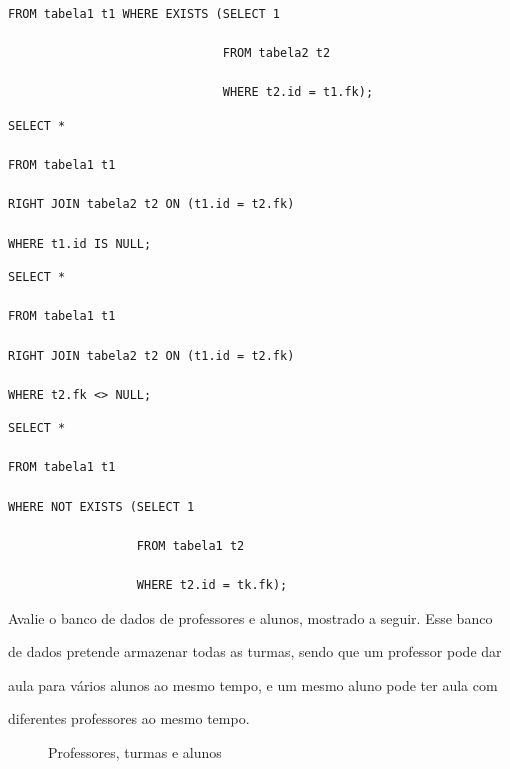 \documentclass[12pt, addpoints]{exam}
\begin{document}
\begin{questions}
\begin{choices}
\begin{verbatim}
FROM tabela1 t1 WHERE EXISTS (SELECT 1

                              FROM tabela2 t2

                              WHERE t2.id = t1.fk);

\end{verbatim}


\choice \begin{verbatim}SELECT *

FROM tabela1 t1

RIGHT JOIN tabela2 t2 ON (t1.id = t2.fk)

WHERE t1.id IS NULL;

\end{verbatim}


\choice \begin{verbatim}SELECT *

FROM tabela1 t1

RIGHT JOIN tabela2 t2 ON (t1.id = t2.fk)

WHERE t2.fk <> NULL;

\end{verbatim}


\choice \begin{verbatim}SELECT *

FROM tabela1 t1

WHERE NOT EXISTS (SELECT 1

                  FROM tabela1 t2

                  WHERE t2.id = tk.fk);

\end{verbatim}


\end{choices}

\question

Avalie o banco de dados de professores e alunos, mostrado a seguir. Esse banco

de dados pretende armazenar todas as turmas, sendo que um professor pode dar

aula para vários alunos ao mesmo tempo, e um mesmo aluno pode ter aula com

diferentes professores ao mesmo tempo.

\begin{figure}[H]

  \centering

  \caption{Professores, turmas e alunos}

  \label{fig:professores}



\end{figure}
\end{questions}
\end{document}
